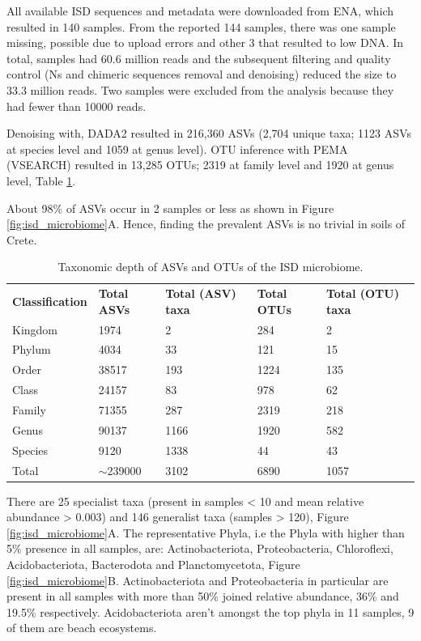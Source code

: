 \documentclass[a4paper,12pt]{article}
\begin{document}
All available ISD sequences and metadata were downloaded from ENA, which resulted in 140 samples. 
From the reported 144 samples, there was one sample missing, possible due to upload errors and other 3 that resulted to low DNA.
In total, samples had 60.6 million reads and the subsequent filtering and quality control (Ns and chimeric sequences removal and denoising)
reduced the size to 33.3 million reads. Two samples were excluded from the analysis because they had
fewer than 10000 reads. 

Denoising with, DADA2 resulted in 216,360 ASVs (2,704 unique
taxa; 1123 ASVs at species level and 1059 at genus level). OTU inference with
PEMA (VSEARCH) resulted in 13,285 OTUs; 2319 at family level and 1920 at genus level, Table \ref{table:asv_taxonomy}.


About 98\% of ASVs occur in 2 samples or less as shown in Figure \ref{fig:isd_microbiome}A.
Hence, finding the prevalent ASVs is no trivial in soils of Crete.

\begin{table}[]
    \caption{Taxonomic depth of ASVs and OTUs of the ISD microbiome.}%
\begin{tabular}{@{}lllll@{}}
    \textbf{Classification} & \textbf{Total ASVs}    & \textbf{Total (ASV) taxa} & \textbf{Total OTUs} & \textbf{Total (OTU) taxa}\\
Kingdom              & 1974         & 2                & 284        & 2               \\
Phylum               & 4034         & 33               & 121        & 15              \\
Order                & 38517        & 193              & 1224       & 135             \\
Class                & 24157        & 83               & 978        & 62              \\
Family               & 71355        & 287              & 2319       & 218             \\
Genus                & 90137        & 1166             & 1920       & 582             \\
Species              & 9120         & 1338             & 44         & 43              \\
Total                & $\sim$239000 & 3102             & 6890       & 1057            
\end{tabular}
\label{table:asv_taxonomy}
\end{table}

There are 25 specialist taxa (present in samples < 10 and mean relative
abundance > 0.003) and 146 generalist taxa (samples > 120), Figure \ref{fig:isd_microbiome}A.
The representative Phyla, i.e the Phyla with higher than 5\% presence in all samples, are:
Actinobacteriota, Proteobacteria, Chloroflexi, Acidobacteriota,
Bacterodota and Planctomycetota, Figure \ref{fig:isd_microbiome}B.
Actinobacteriota and Proteobacteria in particular are present in all samples with 
more than 50\% joined relative abundance, 36\% and 19.5\% respectively.
Acidobacteriota aren't amongst the top phyla in 11 samples, 9 of them are beach
ecosystems.
\end{document}
